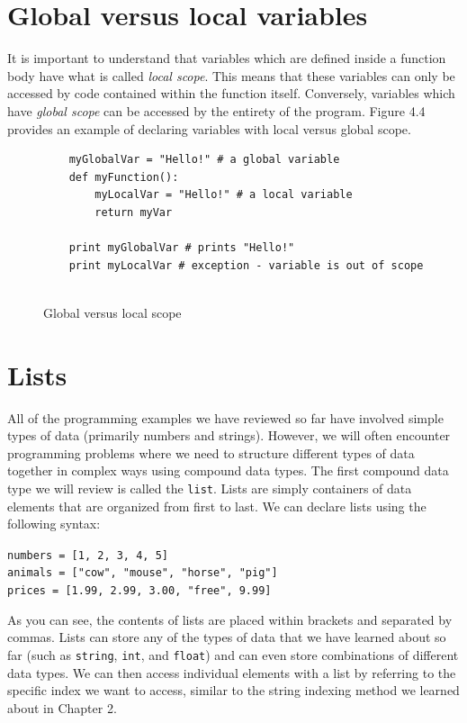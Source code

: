 \documentclass{book}
\begin{document}
\section{Global versus local variables}
It is important to understand that variables which are defined inside a function body have what is called \textit{local scope}. This means that these variables can only be accessed by code contained within the function itself. Conversely, variables which have \textit{global scope} can be accessed by the entirety of the program. Figure 4.4 provides an example of declaring variables with local versus global scope.

\begin{figure}[h]
	\caption{Global versus local scope}
	\begin{lstlisting}
	myGlobalVar = "Hello!" # a global variable
	def myFunction():
		myLocalVar = "Hello!" # a local variable
		return myVar
	
	print myGlobalVar # prints "Hello!" 
	print myLocalVar # exception - variable is out of scope
	
	\end{lstlisting}
\end{figure}

\section{Lists}
All of the programming examples we have reviewed so far have involved simple types of data (primarily numbers and strings). However, we will often encounter programming problems where we need to structure different types of data together in complex ways using compound data types. The first compound data type we will review is called the \texttt{list}. Lists are simply containers of data elements that are organized from first to last. We can declare lists using the following syntax:

\texttt{numbers = [1, 2, 3, 4, 5]} \\
\texttt{animals = ["cow", "mouse", "horse", "pig"]} \\
\texttt{prices = [1.99, 2.99, 3.00, "free", 9.99]}

As you can see, the contents of lists are placed within brackets and separated by commas. Lists can store any of the types of data that we have learned about so far (such as \texttt{string}, \texttt{int}, and \texttt{float}) and can even store combinations of different data types. 
We can then access individual elements with a list by referring to the specific index we want to access, similar to the string indexing method we learned about in Chapter 2.
\end{document}
